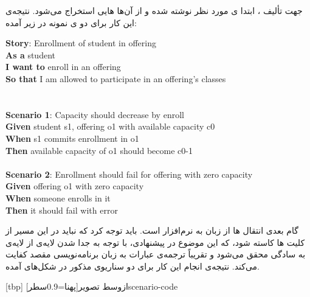 
جهت تألیف ، ابتدا ی مورد نظر نوشته شده و از آن‌ها ‌هایی استخراج می‌شود. نتیجه‌ی این کار برای دو ی نمونه در زیر آمده:

\begin{minipage}{\textwidth}
\latin
\textbf{Story}: Enrollment of student in offering\\
\textbf{As a} student\\
\textbf{I want to} enroll in an offering\\
\textbf{So that} I am allowed to participate in an offering's classes\\
\\
\\
\textbf{Scenario 1}: Capacity should decrease by enroll\\
\textbf{Given}
	student s1, offering o1 with available capacity c0\\
\textbf{When}
	s1 commits enrollment in o1\\
\textbf{Then}
	available capacity of o1 should become c0-1\\
\\
\textbf{Scenario 2}: Enrollment should fail for offering with zero capacity\\
\textbf{Given}
	offering o1 with zero capacity\\
\textbf{When}
	someone enrolls in it\\                               
\textbf{Then}
	it should fail with error\\
\end{minipage}

گام بعدی انتقال ‌ها از زبان  به نرم‌افزار است. باید توجه کرد که نباید در این مسیر از کلیت ‌ها کاسته شود، که این موضوع در  پیشنهادی، با توجه به جدا شدن لایه‌ی  از لایه‌ی  به سادگی محقق می‌شود و تقریباً ترجمه‌ی عبارات به زبان برنامه‌نویسی مقصد کفایت می‌کند. نتیجه‌ی انجام این کار برای دو سناریوی مذکور در شکل‌های  آمده.

[tbp]
‌ازوسط
‌تصویر[پهنا=0.9‌سطر]{scenario-code}


